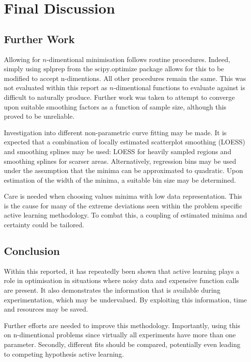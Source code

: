 \chapter{Final Discussion}

\ifpdf
    \graphicspath{{Chapter3/Figs/Raster/}{Chapter3/Figs/PDF/}{Chapter3/Figs/}}
\else
    \graphicspath{{Chapter3/Figs/Vector/}{Chapter3/Figs/}}
\fi

\section{Further Work}
Allowing for $n$-dimentional minimisation follows routine procedures. Indeed, simply using $\text{splprep}$ from the $\text{scipy.optimize}$ package allows for this to be modified to accept n-dimentions. All other procedures remain the same. This was not evaluated within this report as $n$-dimentional functions to evaluate against is difficult to naturally produce. Further work was taken to attempt to converge upon suitable smoothing factors as a function of sample size, although this proved to be unreliable.

Investigation into different non-parametric curve fitting may be made. It is expected that a combination of locally estimated scatterplot smoothing (LOESS) and smoothing splines may be used: LOESS for heavily sampled regions and smoothing splines for scarser areas. Alternatively, regression bins may be used under the assumption that the minima can be approximated to quadratic. Upon estimation of the width of the minima, a suitable bin size may be determined.

Care is needed when choosing values minima with low data representation. This is the cause for many of the extreme deviations seen within the problem specific active learning methodology. To combat this, a coupling of estimated minima and certainty could be tailored. 

\section{Conclusion}
Within this reported, it has repeatedly been shown that active learning plays a role in optimisation in situations where noisy data and expensive function calls are present. It also demonstrates the information that is available during experimentation, which may be undervalued. By exploiting this information, time and resources may be saved.

Further efforts are needed to improve this methodology. Importantly, using this on n-dimentional problems since virtually all experiments have more than one parameter. Secondly, different fits should be compared, potentially even leading to competing hypothesis active learning.